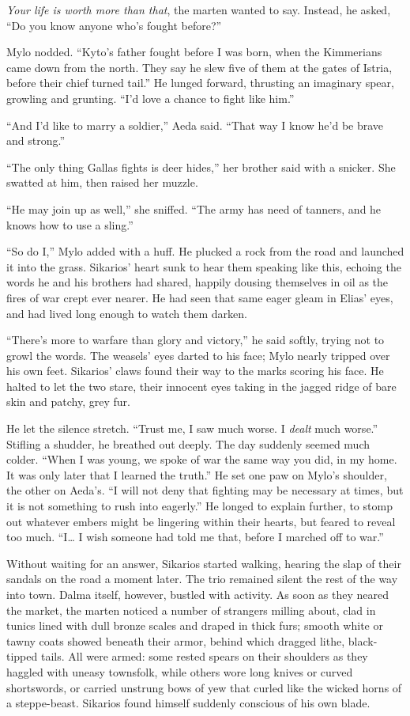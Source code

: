 \emph{Your life is worth more than that}, the marten wanted to say. Instead, he asked, ``Do you know anyone who's fought before?''

Mylo nodded. ``Kyto's father fought before I was born, when the Kimmerians came down from the north. They say he slew five of them at the gates of Istria, before their chief turned tail.'' He lunged forward, thrusting an imaginary spear, growling and grunting. ``I'd love a chance to fight like him.''

``And I'd like to marry a soldier,'' Aeda said. ``That way I know he'd be brave and strong.''

``The only thing Gallas fights is deer hides,'' her brother said with a snicker. She swatted at him, then raised her muzzle.

``He may join up as well,'' she sniffed. ``The army has need of tanners, and he knows how to use a sling.''

``So do I,'' Mylo added with a huff. He plucked a rock from the road and launched it into the grass. Sikarios' heart sunk to hear them speaking like this, echoing the words he and his brothers had shared, happily dousing themselves in oil as the fires of war crept ever nearer. He had seen that same eager gleam in Elias' eyes, and had lived long enough to watch them darken.

``There's more to warfare than glory and victory,'' he said softly, trying not to growl the words. The weasels' eyes darted to his face; Mylo nearly tripped over his own feet. Sikarios' claws found their way to the marks scoring his face. He halted to let the two stare, their innocent eyes taking in the jagged ridge of bare skin and patchy, grey fur.

He let the silence stretch. ``Trust me, I saw much worse. I \emph{dealt} much worse.'' Stifling a shudder, he breathed out deeply. The day suddenly seemed much colder. ``When I was young, we spoke of war the same way you did, in my home. It was only later that I learned the truth.'' He set one paw on Mylo's shoulder, the other on Aeda's. ``I will not deny that fighting may be necessary at times, but it is not something to rush into eagerly.'' He longed to explain further, to stomp out whatever embers might be lingering within their hearts, but feared to reveal too much. ``I\ldots{} I wish someone had told me that, before I marched off to war.''

Without waiting for an answer, Sikarios started walking, hearing the slap of their sandals on the road a moment later. The trio remained silent the rest of the way into town. Dalma itself, however, bustled with activity. As soon as they neared the market, the marten noticed a number of strangers milling about, clad in tunics lined with dull bronze scales and draped in thick furs; smooth white or tawny coats showed beneath their armor, behind which dragged lithe, black-tipped tails. All were armed: some rested spears on their shoulders as they haggled with uneasy townsfolk, while others wore long knives or curved shortswords, or carried unstrung bows of yew that curled like the wicked horns of a steppe-beast. Sikarios found himself suddenly conscious of his own blade.

